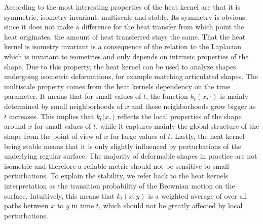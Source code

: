 According to \cite{sun2009concise} the most interesting properties of the heat kernel are that it is symmetric, isometry invariant, multiscale and stable.
Its symmetry is obvious, since it does not make a difference for the heat transfer from which point the heat originates, the amount of heat transferred stays the same.
That the heat kernel is isometry invariant is a consequence of the relation to the Laplacian which is invariant to isometries and only depends on intrinsic properties of the shape.
Due to this property, the heat kernel can be used to analyze shapes undergoing isometric deformations, for example matching articulated shapes.
The multiscale property comes from the heat kernels dependency on the time parameter.
It means that for small values of $t$, the function $k_t(x,\cdot)$ is mainly determined by small neighborhoods of $x$ and these neighborhoods grow bigger as $t$ increases.
This implies that $k_t(x,\dot)$ reflects the local properties of the shape around $x$ for small values of $t$, while it captures mainly the global structure of the shape from the point of view of $x$ for large values of $t$.
Lastly, the heat kernel being stable means that it is only slightly influenced by perturbations of the underlying regular surface.
The majority of deformable shapes in practice are not isometric and therefore a reliable metric should not be sensitive to small perturbations.
To explain the stability, we refer back to the heat kernels  interpretation as the transition probability of the Brownian motion on the surface.
Intuitively, this means that $k_t(x,y)$ is a weighted average of over all paths between $x$ to $y$ in time $t$, which should not be greatly affected by local perturbations.

